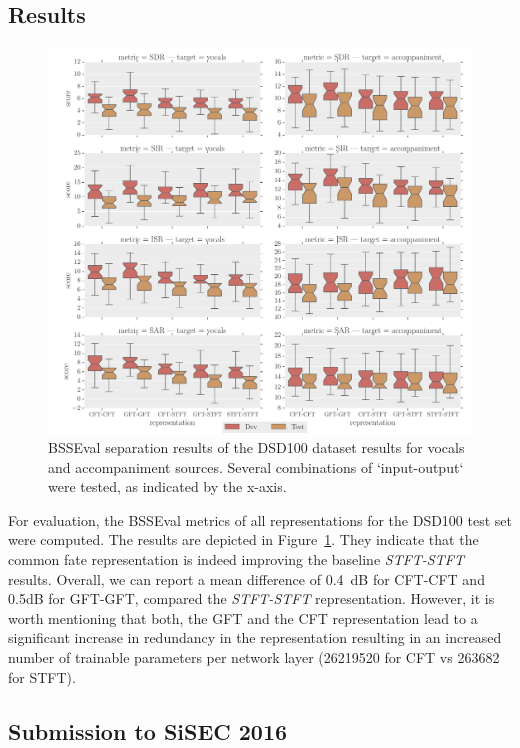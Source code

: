 \subsection{Results}

\begin{figure}[t]
\centering
\includegraphics[width=1.0\textwidth]{Chapters/06_Separation_Unknown/figures/boxplot.pdf}
\caption{BSSEval separation results of the DSD100 dataset results for vocals and accompaniment sources. Several combinations of `input-output` were tested, as indicated by the x-axis.}
\label{fig:deep_cft_boxplots}
\end{figure}

For evaluation, the BSSEval metrics of all representations for the DSD100 test set were computed.
The results are depicted in Figure~\ref{fig:deep_cft_boxplots}.
They indicate that the common fate representation is indeed improving the baseline \emph{STFT-STFT} results.
Overall, we can report a mean difference of 0.4~dB for CFT-CFT and 0.5dB for GFT-GFT, compared the \emph{STFT-STFT} representation.
However, it is worth mentioning that both, the GFT and the CFT representation lead to a significant increase in redundancy in the representation resulting in an increased number of trainable parameters per network layer (26219520 for CFT vs 263682 for STFT).

\subsection{Submission to SiSEC 2016}
\label{ssec:performance}

